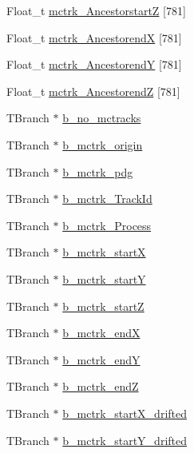 \begin{DoxyCompactItemize}
\item 
Float\-\_\-t \hyperlink{classanatree_ab22c42b1d09acf40dd762618ee7d608d}{mctrk\-\_\-\-Ancestorstart\-Z} \mbox{[}781\mbox{]}
\item 
Float\-\_\-t \hyperlink{classanatree_ad6a37768e8fb4d82160dda13fd74f034}{mctrk\-\_\-\-Ancestorend\-X} \mbox{[}781\mbox{]}
\item 
Float\-\_\-t \hyperlink{classanatree_a15f2c4da3f6bc5fe8a8e60e2ce36a327}{mctrk\-\_\-\-Ancestorend\-Y} \mbox{[}781\mbox{]}
\item 
Float\-\_\-t \hyperlink{classanatree_a19476bc08b05e3253d627e1784806546}{mctrk\-\_\-\-Ancestorend\-Z} \mbox{[}781\mbox{]}
\item 
T\-Branch $\ast$ \hyperlink{classanatree_af97afecb81ba0eb5a8fddf818cb70802}{b\-\_\-no\-\_\-mctracks}
\item 
T\-Branch $\ast$ \hyperlink{classanatree_abb721fc157c14dfc822bc3cdb0ad57ca}{b\-\_\-mctrk\-\_\-origin}
\item 
T\-Branch $\ast$ \hyperlink{classanatree_a31e92e32f30f697fddc8b466caabf896}{b\-\_\-mctrk\-\_\-pdg}
\item 
T\-Branch $\ast$ \hyperlink{classanatree_a2eebb498ef914a493a8e449295f2c284}{b\-\_\-mctrk\-\_\-\-Track\-Id}
\item 
T\-Branch $\ast$ \hyperlink{classanatree_a7dde4e8b9c46b3278df1b0a36b8a3e9d}{b\-\_\-mctrk\-\_\-\-Process}
\item 
T\-Branch $\ast$ \hyperlink{classanatree_a3985f86e1fc2b26e4668dbdc7744774f}{b\-\_\-mctrk\-\_\-start\-X}
\item 
T\-Branch $\ast$ \hyperlink{classanatree_af7ff16eb047ee9c2f240f5f537906623}{b\-\_\-mctrk\-\_\-start\-Y}
\item 
T\-Branch $\ast$ \hyperlink{classanatree_ad05ca0ede41f59d19ae872017e5ce2dc}{b\-\_\-mctrk\-\_\-start\-Z}
\item 
T\-Branch $\ast$ \hyperlink{classanatree_a97d04b995e456e2cbd2a987db13c9889}{b\-\_\-mctrk\-\_\-end\-X}
\item 
T\-Branch $\ast$ \hyperlink{classanatree_a00c93992455d29eef985b9fa379dd8f2}{b\-\_\-mctrk\-\_\-end\-Y}
\item 
T\-Branch $\ast$ \hyperlink{classanatree_ab94f17c6ce8123a8c7c6a8107eb42e43}{b\-\_\-mctrk\-\_\-end\-Z}
\item 
T\-Branch $\ast$ \hyperlink{classanatree_a7d2896a7cabfab099ecbbe61366ed72c}{b\-\_\-mctrk\-\_\-start\-X\-\_\-drifted}
\item 
T\-Branch $\ast$ \hyperlink{classanatree_ace0b1f90992660ae0717fda21f69953b}{b\-\_\-mctrk\-\_\-start\-Y\-\_\-drifted}

\end{DoxyCompactItemize}
